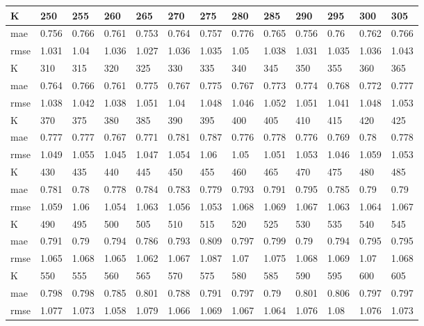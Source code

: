 \begin{appendices}
\begin{center}
\begin{tabularx}{\textwidth}{|l|X|X|X|X|X|X|X|X|X|X|X|X|}
		\hline 
		K & 250 & 255 & 260 & 265 & 270 & 275 & 280 & 285 & 290 & 295 & 300 & 305 \\ \hline 
		mae & 0.756 & 0.766 & 0.761 & 0.753 & 0.764 & 0.757 & 0.776 & 0.765 & 0.756 & 0.76 & 0.762 & 0.766 \\ \hline 
		rmse & 1.031 & 1.04 & 1.036 & 1.027 & 1.036 & 1.035 & 1.05 & 1.038 & 1.031 & 1.035 & 1.036 & 1.043 \\ \hline 
		\hline 
		K & 310 & 315 & 320 & 325 & 330 & 335 & 340 & 345 & 350 & 355 & 360 & 365 \\ \hline 
		mae & 0.764 & 0.766 & 0.761 & 0.775 & 0.767 & 0.775 & 0.767 & 0.773 & 0.774 & 0.768 & 0.772 & 0.777 \\ \hline 
		rmse & 1.038 & 1.042 & 1.038 & 1.051 & 1.04 & 1.048 & 1.046 & 1.052 & 1.051 & 1.041 & 1.048 & 1.053 \\ \hline 
		\hline 
		K & 370 & 375 & 380 & 385 & 390 & 395 & 400 & 405 & 410 & 415 & 420 & 425 \\ \hline 
		mae & 0.777 & 0.777 & 0.767 & 0.771 & 0.781 & 0.787 & 0.776 & 0.778 & 0.776 & 0.769 & 0.78 & 0.778 \\ \hline 
		rmse & 1.049 & 1.055 & 1.045 & 1.047 & 1.054 & 1.06 & 1.05 & 1.051 & 1.053 & 1.046 & 1.059 & 1.053 \\ \hline 
		\hline 
		K & 430 & 435 & 440 & 445 & 450 & 455 & 460 & 465 & 470 & 475 & 480 & 485 \\ \hline 
		mae & 0.781 & 0.78 & 0.778 & 0.784 & 0.783 & 0.779 & 0.793 & 0.791 & 0.795 & 0.785 & 0.79 & 0.79 \\ \hline 
		rmse & 1.059 & 1.06 & 1.054 & 1.063 & 1.056 & 1.053 & 1.068 & 1.069 & 1.067 & 1.063 & 1.064 & 1.067 \\ \hline 
		\hline 
		K & 490 & 495 & 500 & 505 & 510 & 515 & 520 & 525 & 530 & 535 & 540 & 545 \\ \hline 
		mae & 0.791 & 0.79 & 0.794 & 0.786 & 0.793 & 0.809 & 0.797 & 0.799 & 0.79 & 0.794 & 0.795 & 0.795 \\ \hline 
		rmse & 1.065 & 1.068 & 1.065 & 1.062 & 1.067 & 1.087 & 1.07 & 1.075 & 1.068 & 1.069 & 1.07 & 1.068 \\ \hline 
		\hline 
		K & 550 & 555 & 560 & 565 & 570 & 575 & 580 & 585 & 590 & 595 & 600 & 605 \\ \hline 
		mae & 0.798 & 0.798 & 0.785 & 0.801 & 0.788 & 0.791 & 0.797 & 0.79 & 0.801 & 0.806 & 0.797 & 0.797 \\ \hline 
		rmse & 1.077 & 1.073 & 1.058 & 1.079 & 1.066 & 1.069 & 1.067 & 1.064 & 1.076 & 1.08 & 1.076 & 1.073 \\ \hline 

\end{tabularx}
\end{center}
\end{appendices}
